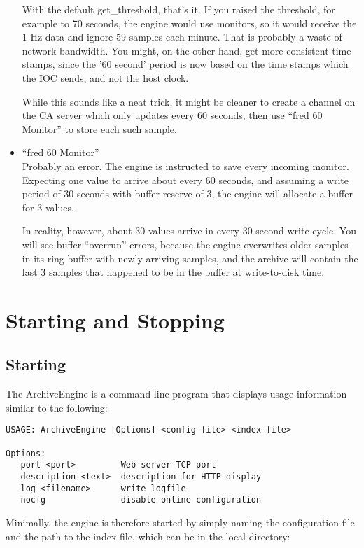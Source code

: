 \begin{itemize}
      With the default get\_threshold, that's it. If you raised the
      threshold, for example to 70 seconds, the engine would use
      monitors, so it would receive the 1 Hz data and ignore 59
      samples each minute. That is probably a waste of network
      bandwidth. You might, on the other hand, get more consistent
      time stamps, since the '60 second' period is now based on the
      time stamps which the IOC sends, and not the host clock.

      While this sounds like a neat trick, it might be cleaner to
      create a channel on the CA server which only updates every 60
      seconds, then use ``fred 60 Monitor'' to store each such sample.
\item ``fred 60 Monitor''\\
      Probably an error. The engine is instructed to save every
      incoming monitor. Expecting one value to arrive about every 60
      seconds, and assuming a write period of 30 seconds with buffer
      reserve of 3, the engine will allocate a buffer for 3 values.

      In reality, however, about 30 values arrive in every 30 second
      write cycle. You will see buffer ``overrun'' errors, because the
      engine overwrites older samples in its ring buffer with newly
      arriving samples, and the archive will contain the last 3
      samples that happened to be in the buffer at write-to-disk time.
\end{itemize}

\section{Starting and Stopping}
\subsection{Starting}
The ArchiveEngine is a command-line program that displays usage
information similar to the following:

\begin{lstlisting}[frame=none,keywordstyle=\sffamily]
USAGE: ArchiveEngine [Options] <config-file> <index-file>
 
Options:
  -port <port>         Web server TCP port
  -description <text>  description for HTTP display
  -log <filename>      write logfile
  -nocfg               disable online configuration
\end{lstlisting}

\noindent Minimally, the engine is therefore started by simply naming the
configuration file and the path to the index file, which can be in the
local directory:

